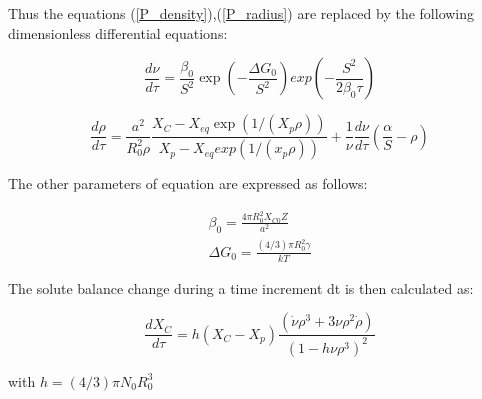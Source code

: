 \documentclass[12pt,a4paper]{article}
\begin{document}
Thus the equations (\ref{P_density}),(\ref{P_radius}) are replaced by the following dimensionless differential equations:

\begin{equation}
	\frac{d\nu}{d\tau} = \frac{\beta_0}{S^2} \exp(-\frac{\Delta G_0}{S^2}) exp(-\frac{S^2}{2\beta_0 \tau}) 
\end{equation}

\begin{equation}
	\frac{d\rho}{d\tau} = \frac{a^2}{R_0^2 \rho}\frac{X_C - X_{eq}\exp(1/(X_p\rho))}{X_p - X_{eq}exp(1/(x_p\rho))} + \frac{1}{\nu}\frac{d\nu}{d\tau}(\frac{\alpha}{S} - \rho) 
\end{equation}

The other parameters of equation are expressed as follows:

\begin{subequations}
	\begin{align}
\beta_0 = \frac{4\pi R_0^2 X_{C0}Z}{a^2} \\
\Delta G_0 = \frac{(4/3) \pi R_0^2 \gamma}{kT} 
	\end{align}	
\end{subequations}

The solute balance change during a time increment dt is then calculated as:

\begin{equation}
\frac{dX_C}{d\tau} = h(X_C - X_p) \frac{(\dot{\nu}\rho^3 + 3\nu \rho^2 \dot{\rho})}{(1 - h \nu \rho^3)^2}
\end{equation}

with $h = (4/3)\pi N_0R_0^3$

%
%
\end{document}
